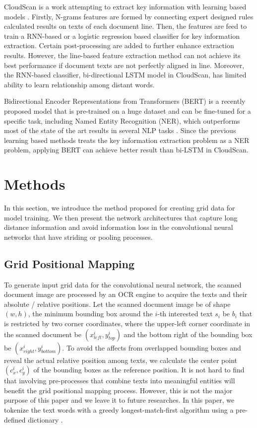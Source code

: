 \documentclass[10pt,twocolumn,letterpaper]{article}
\begin{document}
CloudScan is a work attempting to extract key information with learning based models \cite{cloudscan}. Firstly, N-grams features are formed by connecting expert designed rules calculated results on texts of each document line. Then, the features are feed to train a RNN-based or a logistic regression based classifier for key information extraction. Certain post-processing are added to further enhance extraction results. However, the line-based feature extraction method can not achieve its best performance if document texts are not perfectly aligned in line. Moreover, the RNN-based classifier, bi-directional LSTM model in CloudScan, has limited ability to learn relationship among distant words. 

Bidirectional Encoder Representations from Transformers (BERT) is a recently proposed model that is pre-trained on a huge dataset and can be fine-tuned for a specific task, including Named Entity Recognition (NER), which outperforms most of the state of the art results in several NLP tasks \cite{bert}. Since the previous learning based methods treats the key information extraction problem as a NER problem, applying BERT can achieve better result than bi-LSTM in CloudScan.

\section{Methods}
In this section, we introduce the method proposed for creating grid data for model training. We then present the network architectures that capture long distance information and avoid information loss in the convolutional neural networks that have striding or pooling processes.

\subsection{Grid Positional Mapping}
\label{pm}
To generate input grid data for the convolutional neural network, the scanned document image are processed by an OCR engine to acquire the texts and their absolute / relative positions. Let the scanned document image be of shape $(w, h)$, the minimum bounding box around the $i$-th interested text $s_i$ be $b_i$ that is restricted by two corner coordinates, where the upper-left corner coordinate in the scanned document be $(x^i_{left}, y^i_{top})$ and the bottom right of the bounding box be $(x^i_{right}, y^i_{bottom})$. To avoid the affects from overlapped bounding boxes and reveal the actual relative position among texts, we calculate the center point $(c^i_x, c^i_y)$ of the bounding boxes as the reference position. It is not hard to find that involving pre-processes that combine texts into meaningful entities will benefit the grid positional mapping process. However, this is not the major purpose of this paper and we leave it to future researches. In this paper, we tokenize the text words with a greedy longest-match-first algorithm using a pre-defined dictionary \cite{bertgit}. 
\end{document}
